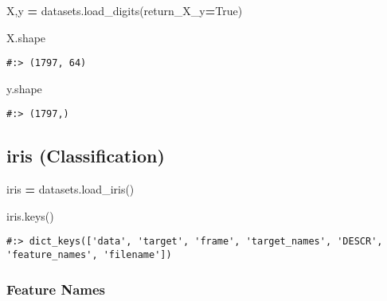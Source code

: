 \documentclass[
]{book}
\newenvironment{Shaded}{\begin{snugshade}}{\end{snugshade}}
\newcommand{\NormalTok}[1]{#1}
\newcommand{\OperatorTok}[1]{\textcolor[rgb]{0.43,0.43,0.43}{\textbf{#1}}}
\newcommand{\VariableTok}[1]{\textcolor[rgb]{0,0,0}{#1}}
\begin{document}
\begin{Shaded}
\begin{Highlighting}[]
\NormalTok{X,y }\OperatorTok{=}\NormalTok{ datasets.load\_digits(return\_X\_y}\OperatorTok{=}\VariableTok{True}\NormalTok{)}
\end{Highlighting}
\end{Shaded}

\begin{Shaded}
\begin{Highlighting}[]
\NormalTok{X.shape}
\end{Highlighting}
\end{Shaded}

\begin{verbatim}
#:> (1797, 64)
\end{verbatim}

\begin{Shaded}
\begin{Highlighting}[]
\NormalTok{y.shape}
\end{Highlighting}
\end{Shaded}

\begin{verbatim}
#:> (1797,)
\end{verbatim}

\hypertarget{iris-classification}{%
\subsection{iris (Classification)}\label{iris-classification}}

\begin{Shaded}
\begin{Highlighting}[]
\NormalTok{iris }\OperatorTok{=}\NormalTok{ datasets.load\_iris()}
\end{Highlighting}
\end{Shaded}

\begin{Shaded}
\begin{Highlighting}[]
\NormalTok{iris.keys()}
\end{Highlighting}
\end{Shaded}

\begin{verbatim}
#:> dict_keys(['data', 'target', 'frame', 'target_names', 'DESCR', 'feature_names', 'filename'])
\end{verbatim}

\hypertarget{feature-names}{%
\subsubsection{Feature Names}\label{feature-names}}
\end{document}
